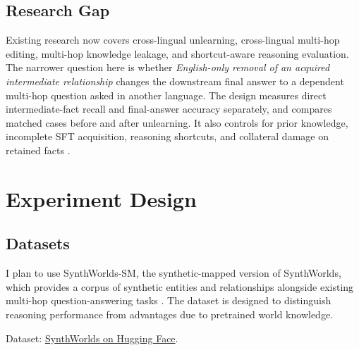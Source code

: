 \documentclass[10pt,a4paper]{article}
\begin{document}
\subsection{Research Gap}

Existing research now covers cross-lingual unlearning,
cross-lingual multi-hop editing, multi-hop knowledge
leakage, and shortcut-aware reasoning evaluation. The
narrower question here is whether \emph{English-only
removal of an acquired intermediate relationship} changes
the downstream final answer to a dependent multi-hop
question asked in another language. The design measures
direct intermediate-fact recall and final-answer accuracy
separately, and compares matched cases before and after
unlearning. It also controls for prior knowledge,
incomplete SFT acquisition, reasoning shortcuts, and
collateral damage on retained facts
\cite{waseem2026falsepositive,thaker2025weak}.


\section{Experiment Design}


\subsection{Datasets}

I plan to use SynthWorlds-SM, the synthetic-mapped
version of SynthWorlds, which provides a corpus of
synthetic entities and relationships alongside
existing multi-hop question-answering tasks
\cite{gu2026synthworlds}. The dataset is designed
to distinguish reasoning performance from advantages
due to pretrained world knowledge.

Dataset:
\href{https://huggingface.co/datasets/kenqgu/SynthWorlds}
{SynthWorlds on Hugging Face}.
\end{document}
